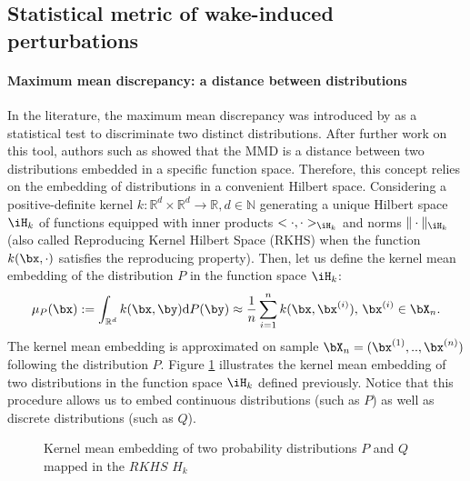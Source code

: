 \subsection{Statistical metric of wake-induced perturbations}
\label{sec:metric}

\paragraph{Maximum mean discrepancy: a distance between distributions}
In the literature, the maximum mean discrepancy was introduced by \cite{gretton_2006} as a statistical test to discriminate two distinct distributions. 
After further work on this tool, authors such as \cite{sriperumbudur_2010} showed that the MMD is a distance between two distributions embedded in a specific function space. 
Therefore, this concept relies on the embedding of distributions in a convenient Hilbert space.
Considering a positive-definite kernel $k:\mathbb{R}^d \times \mathbb{R}^d \xrightarrow{} \mathbb{R},d \in \mathbb{N}$ 
generating a unique Hilbert space $\iH_k$ of functions equipped with inner products $ <\cdot,\cdot >_{\iH_k}$ and norms $\| \cdot \| _{\iH_k}$ (also called Reproducing Kernel Hilbert 
Space (RKHS) when the function $k(\bx,\cdot )$ satisfies the reproducing property). 
Then, let us define the kernel mean embedding of the distribution $P$ in the function space $\iH_k$:
\begin{equation}
\mu_P (\bx):=\int_{\mathbb{R}^d}{k(\bx, \by) \mathrm{d}P(\by) } \approx \frac{1}{n} \sum_{i=1}^{n}{k(\bx,\bx^{(i)})},\, \bx^{(i)} \in \bX_n.
\end{equation}
The kernel mean embedding is approximated on sample $\bX_n=(\bx^{(1)},..,\bx^{(n)})$ following the distribution $P$.
Figure \ref{fig:kernel_embedding} illustrates the kernel mean embedding of two distributions in the function space $\iH_k$ defined previously. 
Notice that this procedure allows us to embed continuous distributions (such as $P$) as well as discrete distributions (such as $Q$).

\begin{figure}[h]
    \centering
    
    \caption{Kernel mean embedding of two probability distributions $P$ and $Q$ mapped in the $RKHS$  $H_k$}
    \label{fig:kernel_embedding}
\end{figure}

